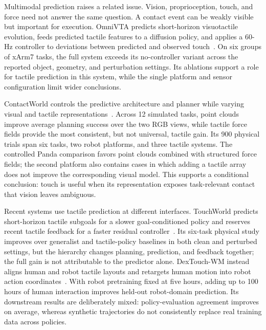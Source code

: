 Multimodal prediction raises a related issue. Vision, proprioception, touch, and force need not answer the same question. A contact event can be weakly visible but important for execution. OmniVTA predicts short-horizon visuotactile evolution, feeds predicted tactile features to a diffusion policy, and applies a 60-Hz controller to deviations between predicted and observed touch~\cite{zheng2026omnivta}. On six groups of xArm7 tasks, the full system exceeds its no-controller variant across the reported object, geometry, and perturbation settings. Its ablations support a role for tactile prediction in this system, while the single platform and sensor configuration limit wider conclusions.

ContactWorld controls the predictive architecture and planner while varying visual and tactile representations~\cite{zhang2026contactworld}. Across 12 simulated tasks, point clouds improve average planning success over the two RGB views, while tactile force fields provide the most consistent, but not universal, tactile gain. Its 900 physical trials span six tasks, two robot platforms, and three tactile systems. The controlled Panda comparison favors point clouds combined with structured force fields; the second platform also contains cases in which adding a tactile array does not improve the corresponding visual model. This supports a conditional conclusion: touch is useful when its representation exposes task-relevant contact that vision leaves ambiguous.

Recent systems use tactile prediction at different interfaces. TouchWorld predicts short-horizon tactile subgoals for a slower goal-conditioned policy and reserves recent tactile feedback for a faster residual controller~\cite{zhou2026touchworld}. Its six-task physical study improves over generalist and tactile-policy baselines in both clean and perturbed settings, but the hierarchy changes planning, prediction, and feedback together; the full gain is not attributable to the predictor alone. DexTouch-WM instead aligns human and robot tactile layouts and retargets human motion into robot action coordinates~\cite{qin2026dextouch}. With robot pretraining fixed at five hours, adding up to 100 hours of human interaction improves held-out robot-domain prediction. Its downstream results are deliberately mixed: policy-evaluation agreement improves on average, whereas synthetic trajectories do not consistently replace real training data across policies.

